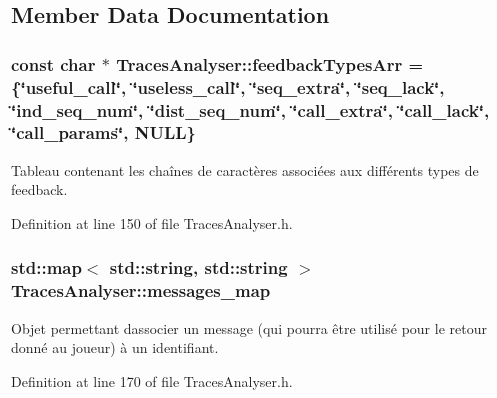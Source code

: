 \subsection{Member Data Documentation}
\subsubsection[{\texorpdfstring{feedback\+Types\+Arr}{feedbackTypesArr}}]{\setlength{\rightskip}{0pt plus 5cm}const char $\ast$ Traces\+Analyser\+::feedback\+Types\+Arr = \{\char`\"{}useful\+\_\+call\char`\"{}, \char`\"{}useless\+\_\+call\char`\"{}, \char`\"{}seq\+\_\+extra\char`\"{}, \char`\"{}seq\+\_\+lack\char`\"{}, \char`\"{}ind\+\_\+seq\+\_\+num\char`\"{}, \char`\"{}dist\+\_\+seq\+\_\+num\char`\"{}, \char`\"{}call\+\_\+extra\char`\"{}, \char`\"{}call\+\_\+lack\char`\"{}, \char`\"{}call\+\_\+params\char`\"{}, N\+U\+LL\}\hspace{0.3cm}{\ttfamily [static]}}\hypertarget{class_traces_analyser_af1de6c1349fdad93945a0d8079451d22}{}\label{class_traces_analyser_af1de6c1349fdad93945a0d8079451d22}
Tableau contenant les chaînes de caractères associées aux différents types de feedback. 

Definition at line 150 of file Traces\+Analyser.\+h.

\subsubsection[{\texorpdfstring{messages\+\_\+map}{messages_map}}]{\setlength{\rightskip}{0pt plus 5cm}std\+::map$<$ std\+::string, std\+::string $>$ Traces\+Analyser\+::messages\+\_\+map\hspace{0.3cm}{\ttfamily [static]}}\hypertarget{class_traces_analyser_a2addfbe4fff91dcaa53b83163144bf45}{}\label{class_traces_analyser_a2addfbe4fff91dcaa53b83163144bf45}
Objet permettant d\textquotesingle{}associer un message (qui pourra être utilisé pour le retour donné au joueur) à un identifiant. 

Definition at line 170 of file Traces\+Analyser.\+h.

